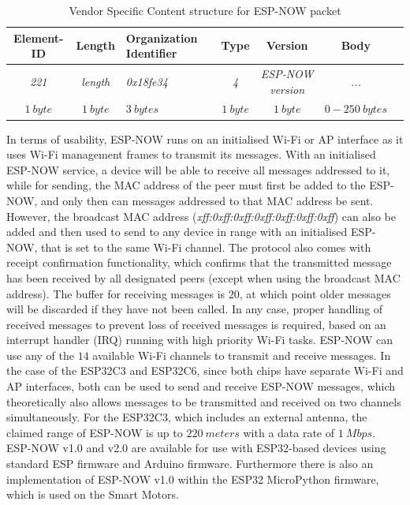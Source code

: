 \begin{table}[H]
    \centering
    \begin{tabular}{|c|c|>{\centering\arraybackslash}m{70pt}|c|c|c|c|}
        \hline
        \textbf{Element-ID} & \textbf{Length} & \textbf{Organization Identifier} & \textbf{Type} & \textbf{Version} & \textbf{Body} \\
        \hline\hline
        \textit{221} & \textit{length} & \textit{0x18fe34} & \textit{4} & \textit{ESP-NOW version} & \textit{...} \\
        \hline\hline
        $1\ byte$ & $1\ byte$ & $3\ bytes$ & $1\ byte$ & $1\ byte$ & $0-250\ bytes$ \\
        \hline
    \end{tabular}
    \vspace{\ftspace}
    \caption{Vendor Specific Content structure for ESP-NOW packet \citep[adapted from][]{espressif_systems_esp-now_nodate}}
    \label{tab:vendorpecificcontent}
\end{table}

In terms of usability, ESP-NOW runs on an initialised Wi-Fi or AP interface as it uses Wi-Fi management frames to transmit its messages. With an initialised ESP-NOW service, a device will be able to receive all messages addressed to it, while for sending, the MAC address of the peer must first be added to the ESP-NOW, and only then can messages addressed to that MAC address be sent. However, the broadcast MAC address (\textit{xff:0xff:0xff:0xff:0xff:0xff:0xff}) can also be added and then used to send to any device in range with an initialised ESP-NOW, that is set to the same Wi-Fi channel. The protocol also comes with receipt confirmation functionality, which confirms that the transmitted message has been received by all designated peers (except when using the broadcast MAC address). The buffer for receiving messages is $20$, at which point older messages will be discarded if they have not been called. In any case, proper handling of received messages to prevent loss of received messages is required, based on an interrupt handler (IRQ) running with high priority Wi-Fi tasks. ESP-NOW can use any of the $14$ available Wi-Fi channels to transmit and receive messages. In the case of the ESP32C3 and ESP32C6, since both chips have separate Wi-Fi and AP interfaces, both can be used to send and receive ESP-NOW messages, which theoretically also allows messages to be transmitted and received on two channels simultaneously. For the ESP32C3, which includes an external antenna, the claimed range of ESP-NOW is up to $220\ meters$ with a data rate of $1\ Mbps$. ESP-NOW v1.0 and v2.0 are available for use with ESP32-based devices using standard ESP firmware and Arduino firmware. Furthermore there is also an implementation of ESP-NOW v1.0 within the ESP32 MicroPython firmware, which is used on the Smart Motors. \citep{espressif_systems_esp-now_nodate, micropython_micropython_2025-1, eridani_comparative_2021}\\


